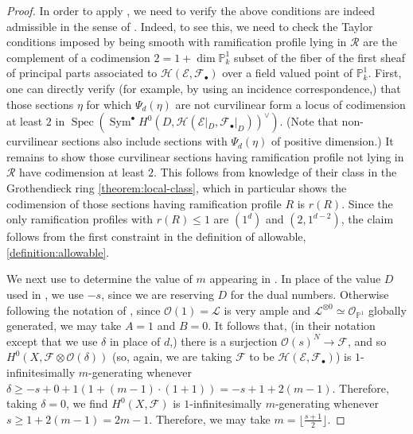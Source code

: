 \documentclass[12 pt]{amsart}
\theoremstyle{plain}
\theoremstyle{definition}
\theoremstyle{remark}
\numberwithin{equation}{section}
\newcommand\bp{\mathbb P}
\newcommand\sce{\mathscr E}
\newcommand\scf{\mathscr F}
\newcommand\sch{\mathscr H}
\newcommand\sco{\mathscr O}
\DeclareMathOperator\spec{\operatorname{Spec}}
\DeclareMathOperator\sym{Sym}
\begin{document}
\begin{proof}
In order to apply 
\cite[Thm.\
9.3.1]{biluH:motivic-euler-products-in-motivic-statistics},
we need to verify the above conditions are indeed admissible in the sense of
\cite[Def.\ 9.2.6]{biluH:motivic-euler-products-in-motivic-statistics}.
Indeed, to see this, we need to check
the Taylor conditions imposed by being smooth with ramification profile lying in
$\mathcal R$
are the complement of a codimension $2 = 1 + \dim \bp^1_k$ subset of the fiber
of the first sheaf of principal parts associated to $\sch(\sce, \scf_\bullet)$
over a field valued point of $\bp^1_k$.  
First, one can directly verify (for example, by using an incidence
correspondence,) that those sections $\eta$ for which
$\Psi_d(\eta)$ are not curvilinear
form a locus of codimension at least $2$ in
$\spec \left( \sym^\bullet H^0(D, \sch(\sce|_D,
\scf_\bullet|_D))^\vee \right)$.
(Note that non-curvilinear sections also include sections with $\Psi_d(\eta)$ of positive dimension.)
It remains to show those curvilinear sections having ramification profile not
lying in $\mathcal R$ have codimension at least $2$. 
This follows from
knowledge of their class in the Grothendieck ring \autoref{theorem:local-class},
which in particular shows the codimension
of those sections having ramification profile $R$ is $r(R)$.
Since the only ramification profiles with $r(R) \leq 1$ are $(1^d)$ and $(2,
1^{d-2})$, the claim follows from the first constraint in the definition of
allowable, \autoref{definition:allowable}.


	We next use \cite[Ex.\
	5.4.6]{biluH:motivic-euler-products-in-motivic-statistics} to determine
	the value of $m$ appearing in \cite[Thm.\  9.3.1]{biluH:motivic-euler-products-in-motivic-statistics}.  In place of the value $D$
	used in \cite[Ex.\
	5.4.6]{biluH:motivic-euler-products-in-motivic-statistics}, we use
	$-s$,
	since we are reserving $D$ for the dual numbers.  Otherwise following
	the notation of \cite[Ex.\
	5.4.6]{biluH:motivic-euler-products-in-motivic-statistics}, since
	$\sco(1) = \mathcal L$ is very ample and $\mathcal L^{\otimes 0} \simeq
	\sco_{\bp^1}$ globally generated, we may take $A = 1$ and $B = 0$.  It
	follows that, (in their notation except that we use $\delta$ in place of
	$d$,) there is a surjection
	$\sco(s)^{N} \to \scf$, and so $H^0(X, \scf \otimes \sco(\delta))$ 
	(so, again, we are taking $\scf$ to be $\sch(\sce, \scf_\bullet)$)	
	is
	$1$-infinitesimally $m$-generating whenever
	$\delta \geq -s + 0 + 1(1 + (m-1)\cdot (1+1)) = -s + 1 + 2(m-1).$
	Therefore, taking $\delta = 0$, we find
	$H^0(X, \scf)$ is $1$-infinitesimally $m$-generating whenever
	$s \geq 1 + 2(m-1) = 2m - 1$.
	Therefore, we may take $m = \lfloor \frac{s + 1}{2} \rfloor$.  


\end{proof}
\end{document}
